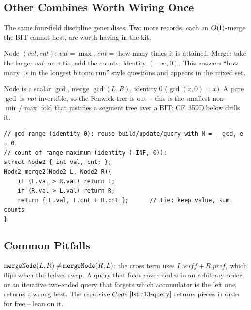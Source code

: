 \subsection{Other Combines Worth Wiring Once}

The same four-field discipline generalises.  Two more records, each an
\(O(1)\)-merge the BIT cannot host, are worth having in the kit:

  Node \((\mathit{val},\mathit{cnt})\):
\(\mathit{val}=\max\), \(\mathit{cnt}=\) how many times it is attained.  Merge:
take the larger \(\mathit{val}\); on a tie, add the counts.  Identity
\((-\infty,0)\).  This answers ``how many \(1\)s in the longest bitonic run''
style questions and appears in the mixed set.

  Node is a scalar
\(\gcd\), merge \(\gcd(L,R)\), identity \(0\) (\(\gcd(x,0)=x\)).  A pure \(\gcd\)
is \emph{not} invertible, so the Fenwick tree is out -- this is the smallest
non-\(\min/\max\) fold that justifies a segment tree over a BIT; CF~359D below
drills it.

\begin{lstlisting}[caption={swap the fold in O(1) lines: gcd-range and count-of-max, same skeleton}, label={lst:c13-gcdcount}]
// gcd-range (identity 0): reuse build/update/query with M = __gcd, e = 0
// count of range maximum (identity (-INF, 0)):
struct Node2 { int val, cnt; };
Node2 merge2(Node2 L, Node2 R){
    if (L.val > R.val) return L;
    if (R.val > L.val) return R;
    return { L.val, L.cnt + R.cnt };      // tie: keep value, sum counts
}
\end{lstlisting}

\subsection{Common Pitfalls}

\begin{warningbox}
\(\texttt{mergeNode}(L,R)\ne\texttt{mergeNode}(R,L)\): the cross term uses
\(L.\mathit{suff}+R.\mathit{pref}\), which flips when the halves swap.  A query
that folds cover nodes in an arbitrary order, or an iterative two-ended query
that forgets which accumulator is the left one, returns a wrong best.  The
recursive \(\coderef{c13-query}\) returns pieces in order for free -- lean on it.
\end{warningbox}

